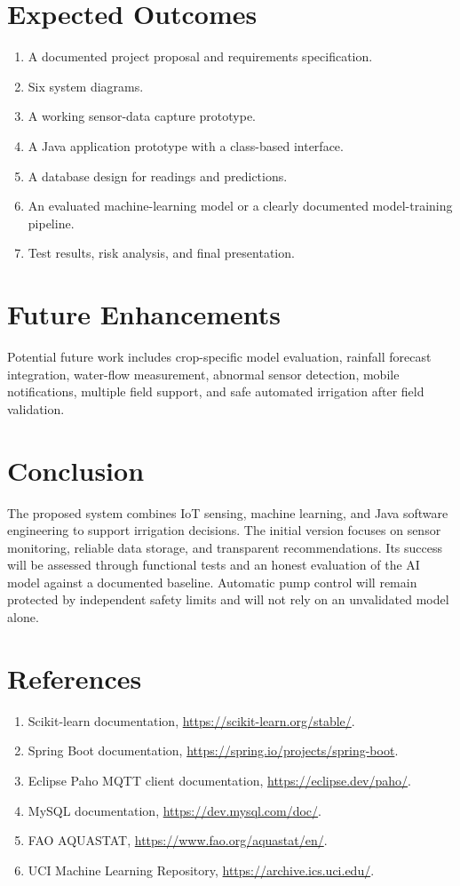 \documentclass[12pt,a4paper]{report}
\begin{document}
\chapter{Expected Outcomes}
\begin{enumerate}[leftmargin=*]
\item A documented project proposal and requirements specification.
\item Six system diagrams.
\item A working sensor-data capture prototype.
\item A Java application prototype with a class-based interface.
\item A database design for readings and predictions.
\item An evaluated machine-learning model or a clearly documented model-training pipeline.
\item Test results, risk analysis, and final presentation.
\end{enumerate}

\chapter{Future Enhancements}
Potential future work includes crop-specific model evaluation, rainfall forecast integration, water-flow measurement, abnormal sensor detection, mobile notifications, multiple field support, and safe automated irrigation after field validation.

\chapter{Conclusion}
The proposed system combines IoT sensing, machine learning, and Java software engineering to support irrigation decisions. The initial version focuses on sensor monitoring, reliable data storage, and transparent recommendations. Its success will be assessed through functional tests and an honest evaluation of the AI model against a documented baseline. Automatic pump control will remain protected by independent safety limits and will not rely on an unvalidated model alone.

\chapter{References}
\begin{enumerate}[leftmargin=*]
\item Scikit-learn documentation, \url{https://scikit-learn.org/stable/}.
\item Spring Boot documentation, \url{https://spring.io/projects/spring-boot}.
\item Eclipse Paho MQTT client documentation, \url{https://eclipse.dev/paho/}.
\item MySQL documentation, \url{https://dev.mysql.com/doc/}.
\item FAO AQUASTAT, \url{https://www.fao.org/aquastat/en/}.
\item UCI Machine Learning Repository, \url{https://archive.ics.uci.edu/}.
\end{enumerate}
\end{document}
